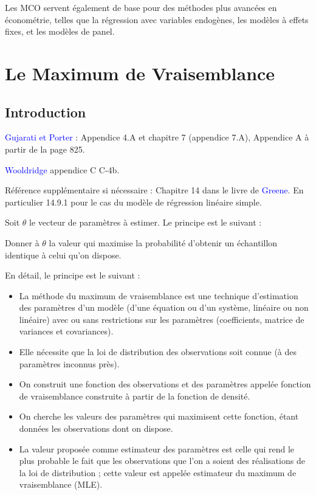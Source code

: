 \documentclass[14pt]{extarticle} %
\newcommand{\livre}[1]{\textcolor{blue}{#1}}
\begin{document}
Les MCO servent également de base pour des méthodes plus avancées en économétrie, telles que la régression avec variables endogènes, les modèles à effets fixes, et les modèles de panel.

\section{Le Maximum de Vraisemblance}

\subsection{Introduction}

\livre{Gujarati et Porter} : Appendice 4.A et chapitre 7 (appendice 7.A), Appendice A à partir de la page 825.

\livre{Wooldridge} appendice C C-4b.

Référence supplémentaire si nécessaire : Chapitre 14 dans le livre de \livre{Greene}. En particulier 14.9.1 pour le cas du modèle de régression linéaire simple.

Soit \(\theta\) le vecteur de paramètres à estimer. Le principe est le suivant :

Donner à \(\theta\) la valeur qui maximise la probabilité d’obtenir un échantillon identique à celui qu’on dispose.

En détail, le principe est le suivant :

\begin{itemize}
    \item La méthode du maximum de vraisemblance est une technique d’estimation des paramètres d’un modèle (d’une équation ou d’un système, linéaire ou non linéaire) avec ou sans restrictions sur les paramètres (coefficients, matrice de variances et covariances).
    \item Elle nécessite que la loi de distribution des observations soit connue (à des paramètres inconnus près).
    \item On construit une fonction des observations et des paramètres appelée fonction de vraisemblance construite à partir de la fonction de densité.
    \item On cherche les valeurs des paramètres qui maximisent cette fonction, étant données les observations dont on dispose.
    \item La valeur proposée comme estimateur des paramètres est celle qui rend le plus probable le fait que les observations que l’on a soient des réalisations de la loi de distribution ; cette valeur est appelée estimateur du maximum de vraisemblance (MLE).
\end{itemize}
\end{document}
